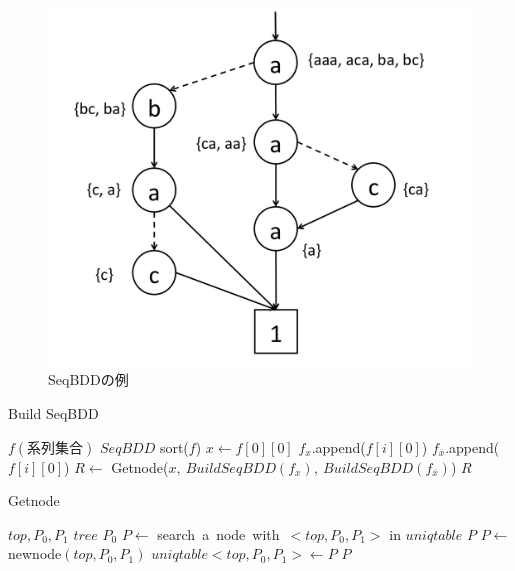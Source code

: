 \documentclass[12pt,twoside, fleqn]{ujbook}
\begin{document}
	\begin{figure}[htbp]
	\begin{center}
		\includegraphics [clip, width=14cm]{./img/seqbdd_sample.png}
		\caption{SeqBDDの例}
		\label{fig:seqbdd_sample}
	\end{center}
	\end{figure}


\begin{algorithm}
		\caption{Build SeqBDD}
		\label{alg:build_seqbdd}
		\begin{algorithmic}[1]
		\REQUIRE $f(系列集合)$
		\ENSURE	 $SeqBDD$
			\STATE sort($f$)
			\RETURN \TRUE
			\RETURN \FALSE
			\ENDIF
			\STATE $x \leftarrow f[0][0]$	
					\STATE $f_{x}$.append($f[i][0]$)
				\ELSE
					\STATE $f_{\overline{x}}$.append($f[i][0]$)
				\ENDIF
			\ENDFOR
			\STATE $R \leftarrow$ Getnode($x,\ Build SeqBDD(f_{x}),\ BuildSeqBDD(f_{\overline{x}})$)
			\RETURN $R$

		\end{algorithmic}
		\end{algorithm}

		\begin{algorithm}
		\caption{Getnode}
		\label{alg:getnode}
		\begin{algorithmic}[1]
		\REQUIRE $top, P_{0}, P_{1}$
		\ENSURE $tree$ 
				\RETURN $P_{0}$	
			\ENDIF
			\STATE $P \leftarrow$ search\ a\ node\ with\ $<top, P_{0}, P_{1}>$ in $uniqtable$
				\RETURN $P$ 
			\ENDIF
			\STATE $P \leftarrow$ newnode$(top,P_{0},P_{1})$
			\STATE $uniqtable<top,P_{0},P_{1}> \leftarrow P$
			\RETURN $P$
		\end{algorithmic}
		\end{algorithm}
\end{document}
